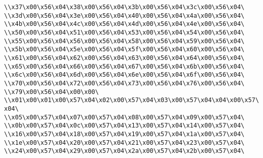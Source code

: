 \verb|\\x37\x00\x56\x04\x38\x00\x56\x04\x3b\x00\x56\x04\x3c\x00\x56\x04\|\newline
\verb|\\x3d\x00\x56\x04\x3e\x00\x56\x04\x40\x00\x56\x04\x4a\x00\x56\x04\|\newline
\verb|\\x4b\x00\x56\x04\x4c\x00\x56\x04\x4d\x00\x56\x04\x4e\x00\x56\x04\|\newline
\verb|\\x50\x00\x56\x04\x51\x00\x56\x04\x53\x00\x56\x04\x54\x00\x56\x04\|\newline
\verb|\\x55\x00\x56\x04\x56\x00\x56\x04\x58\x00\x56\x04\x59\x00\x56\x04\|\newline
\verb|\\x5b\x00\x56\x04\x5e\x00\x56\x04\x5f\x00\x56\x04\x60\x00\x56\x04\|\newline
\verb|\\x61\x00\x56\x04\x62\x00\x56\x04\x63\x00\x56\x04\x64\x00\x56\x04\|\newline
\verb|\\x65\x00\x56\x04\x66\x00\x56\x04\x67\x00\x56\x04\x6b\x00\x56\x04\|\newline
\verb|\\x6c\x00\x56\x04\x6d\x00\x56\x04\x6e\x00\x56\x04\x6f\x00\x56\x04\|\newline
\verb|\\x70\x00\x56\x04\x72\x00\x56\x04\x73\x00\x56\x04\x76\x00\x56\x04\|\newline
\verb|\\x79\x00\x56\x04\x00\x00\|\newline
\verb|\\x01\x00\x01\x00\x57\x04\x02\x00\x57\x04\x03\x00\x57\x04\x04\x00\x57\x04\|\newline
\verb|\\x05\x00\x57\x04\x07\x00\x57\x04\x08\x00\x57\x04\x09\x00\x57\x04\|\newline
\verb|\\x0b\x00\x57\x04\x0c\x00\x57\x04\x13\x00\x57\x04\x14\x00\x57\x04\|\newline
\verb|\\x16\x00\x57\x04\x18\x00\x57\x04\x19\x00\x57\x04\x1a\x00\x57\x04\|\newline
\verb|\\x1e\x00\x57\x04\x20\x00\x57\x04\x21\x00\x57\x04\x23\x00\x57\x04\|\newline
\verb|\\x24\x00\x57\x04\x29\x00\x57\x04\x2a\x00\x57\x04\x2b\x00\x57\x04\|\newline
